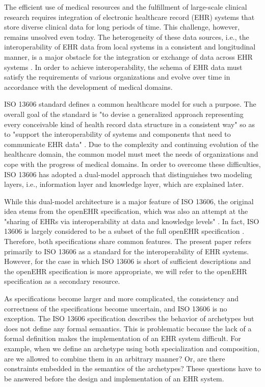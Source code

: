 \documentclass[preprint,3p,onecolumn,times,review]{article}
\begin{document}
The efficient use of medical resources and the fulfillment of large-scale clinical research requires integration of electronic healthcare record (EHR) systems that store diverse clinical data for long periods of time.
This challenge, however, remains unsolved even today.
The heterogeneity of these data sources, i.e., the interoperability of EHR data from local systems in a consistent and longitudinal manner, is a major obstacle for the integration or exchange of data across EHR systems \cite{sujansky01:_heter}.
In order to achieve interoperability, the schema of EHR data must satisfy the requirements of various organizations and evolve over time in accordance with the development of medical domains.

ISO 13606 standard defines a common healthcare model for such a purpose.
The overall goal of the standard is "to devise a generalized approach representing every conceivable kind of health record data structure in a consistent way" \cite[vi]{iso08:13606_healt_elect_part1} so as to "support the interoperability of systems and components that need to communicate EHR data" \cite[v]{iso08:13606_healt_elect_part1}.
Due to the complexity and continuing evolution of the healthcare domain, the common model must meet the needs of organizations and cope with the progress of medical domains.
In order to overcome these difficulties, ISO 13606 has adopted a dual-model approach that distinguishes two modeling layers, i.e., information layer and knowledge layer, which are explained later.

While this dual-model architecture is a major feature of ISO 13606, the  original idea stems from the openEHR specification, which was also an attempt at the "sharing of EHRs via interoperability at data and knowledge levels" \cite[p.12]{beale08:_openeh_archit_overv}.
In fact, ISO 13606 is largely considered to be a subset of the full openEHR specification \cite{peter:_relationship_cen13606_hl7_openehr,chen09:_archet_conversion_ehr_model}. Therefore, both specifications share common features.
The present paper refers primarily to ISO 13606 as a standard for the interoperability of EHR systems. However, for the case in which ISO 13606 is short of sufficient descriptions and the openEHR specification is more appropriate, we will refer to the openEHR specification as a secondary resource.

As specifications become larger and more complicated, the consistency and correctness of the specifications become uncertain, and ISO 13606 is no exception.
The ISO 13606 specification describes the behavior of archetypes but does not define any formal semantics.
This is problematic because the lack of a formal definition makes the implementation of an EHR system difficult.
For example, when we define an archetype using both specialization and composition, are we allowed to combine them in an arbitrary manner? Or, are there constraints embedded in the semantics of the archetypes?
These questions have to be answered before the design and implementation of an EHR system.
\end{document}
